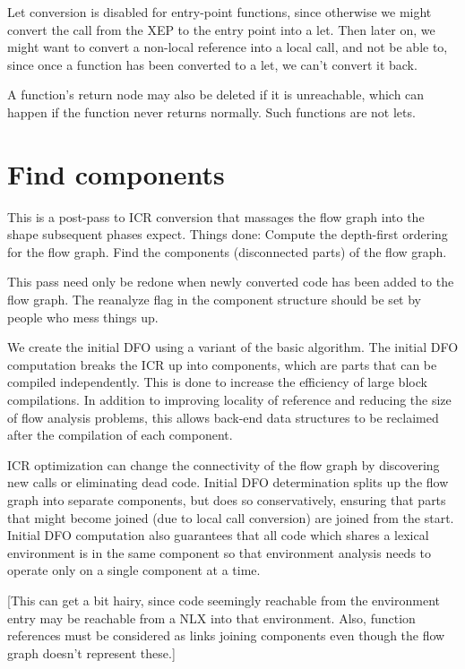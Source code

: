 Let conversion is disabled for entry-point functions, since otherwise we might
convert the call from the XEP to the entry point into a let.  Then later on, we
might want to convert a non-local reference into a local call, and not be able
to, since once a function has been converted to a let, we can't convert it
back.


A function's return node may also be deleted if it is unreachable, which can
happen if the function never returns normally.  Such functions are not lets.

\chapter{Find components}

This is a post-pass to ICR conversion that massages the flow graph into the
shape subsequent phases expect.  Things done:
  Compute the depth-first ordering for the flow graph.
  Find the components (disconnected parts) of the flow graph.

This pass need only be redone when newly converted code has been added to the
flow graph.  The reanalyze flag in the component structure should be set by
people who mess things up.

We create the initial DFO using a variant of the basic algorithm.  The initial
DFO computation breaks the ICR up into components, which are parts that can be
compiled independently.  This is done to increase the efficiency of large block
compilations.  In addition to improving locality of reference and reducing the
size of flow analysis problems, this allows back-end data structures to be
reclaimed after the compilation of each component.

ICR optimization can change the connectivity of the flow graph by discovering
new calls or eliminating dead code.  Initial DFO determination splits up the
flow graph into separate components, but does so conservatively, ensuring that
parts that might become joined (due to local call conversion) are joined from
the start.  Initial DFO computation also guarantees that all code which shares
a lexical environment is in the same component so that environment analysis
needs to operate only on a single component at a time.

[This can get a bit hairy, since code seemingly reachable from the
environment entry may be reachable from a NLX into that environment.  Also,
function references must be considered as links joining components even though
the flow graph doesn't represent these.]

